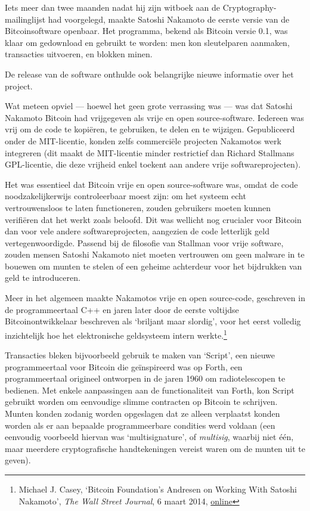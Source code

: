 \documentclass[
  a5paper,
  smalldemyvopaper,11pt,twoside,onecolumn,openright,extrafontsizes]{memoir}
\begin{document}
Iets meer dan twee maanden nadat hij zijn witboek aan de
Cryptography-mailinglijst had voorgelegd, maakte Satoshi Nakamoto de
eerste versie van de Bitcoinsoftware openbaar. Het programma, bekend als
Bitcoin versie 0.1, was klaar om gedownload en gebruikt te worden: men
kon sleutelparen aanmaken, transacties uitvoeren, en blokken minen.

De release van de software onthulde ook belangrijke nieuwe informatie
over het project.

Wat meteen opviel --- hoewel het geen grote verrassing was --- was dat
Satoshi Nakamoto Bitcoin had vrijgegeven als vrije en open
source-software. Iedereen was vrij om de code te kopiëren, te gebruiken,
te delen en te wijzigen. Gepubliceerd onder de MIT-licentie, konden
zelfs commerciële projecten Nakamotos werk integreren (dit maakt de
MIT-licentie minder restrictief dan Richard Stallmans GPL-licentie, die
deze vrijheid enkel toekent aan andere vrije softwareprojecten).

Het was essentieel dat Bitcoin vrije en open source-software was, omdat
de code noodzakelijkerwijs controleerbaar moest zijn: om het systeem
echt vertrouwensloos te laten functioneren, zouden gebruikers moeten
kunnen verifiëren dat het werkt zoals beloofd. Dit was wellicht nog
crucialer voor Bitcoin dan voor vele andere softwareprojecten, aangezien
de code letterlijk geld vertegenwoordigde. Passend bij de filosofie van
Stallman voor vrije software, zouden mensen Satoshi Nakamoto niet moeten
vertrouwen om geen malware in te bouewen om munten te stelen of een
geheime achterdeur voor het bijdrukken van geld te introduceren.

Meer in het algemeen maakte Nakamotos vrije en open source-code,
geschreven in de programmeertaal C++ en jaren later door de eerste
voltijdse Bitcoinontwikkelaar beschreven als `briljant maar slordig',
voor het eerst volledig inzichtelijk hoe het elektronische geldsysteem
intern werkte.\footnote{Michael J. Casey, `Bitcoin Foundation's Andresen
  on Working With Satoshi Nakamoto', \emph{The Wall Street Journal}, 6
  maart 2014, \href{https://www.wsj.com/articles/BL-MBB-17626}{online}}

Transacties bleken bijvoorbeeld gebruik te maken van `Script', een
nieuwe programmeertaal voor Bitcoin die geïnspireerd was op Forth, een
programmeertaal origineel ontworpen in de jaren 1960 om radiotelescopen
te bedienen. Met enkele aanpassingen aan de functionaliteit van Forth,
kon Script gebruikt worden om eenvoudige slimme contracten op Bitcoin te
schrijven. Munten konden zodanig worden opgeslagen dat ze alleen
verplaatst konden worden als er aan bepaalde programmeerbare condities
werd voldaan (een eenvoudig voorbeeld hiervan was `multisignature', of
\emph{multisig}, waarbij niet één, maar meerdere cryptografische
handtekeningen vereist waren om de munten uit te geven).
\end{document}
